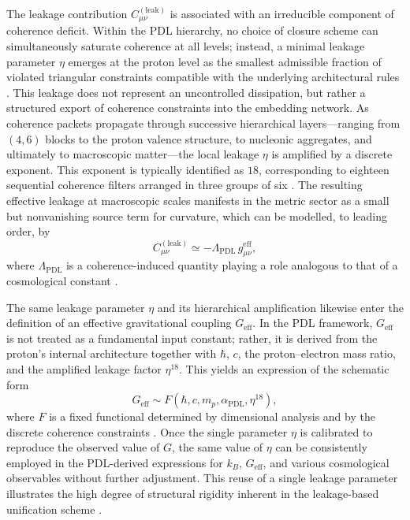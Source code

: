 \documentclass[11pt,a4paper]{article}
\theoremstyle{definition}
\newcommand{\PDL}{\mathrm{PDL}}
\newcommand{\Geff}{G_{\mathrm{eff}}}
\newcommand{\alphaPDL}{\alpha_{\mathrm{PDL}}}
\newcommand{\etaL}{\eta} %
\begin{document}
The leakage contribution $C_{\mu\nu}^{(\mathrm{leak})}$ is associated with an irreducible component of coherence deficit. Within the PDL hierarchy, no choice of closure scheme can simultaneously saturate coherence at all levels; instead, a minimal leakage parameter $\etaL$ emerges at the proton level as the smallest admissible fraction of violated triangular constraints compatible with the underlying architectural rules \cite{A_Topological_Reformulation_in_the_Projective_Dynamic_Logo_Framework_Hierarchical_Coherence_Filtering_and_the_Exponent_18_in_PDL,PDL_Global_Mapping_Structures_Results_Open_Problems}. This leakage does not represent an uncontrolled dissipation, but rather a structured export of coherence constraints into the embedding network. As coherence packets propagate through successive hierarchical layers—ranging from $(4,6)$ blocks to the proton valence structure, to nucleonic aggregates, and ultimately to macroscopic matter—the local leakage $\etaL$ is amplified by a discrete exponent. This exponent is typically identified as $18$, corresponding to eighteen sequential coherence filters arranged in three groups of six \cite{Hierarchical_Coherence_Filtering_and_the_Exponent_18_in_PDL}. The resulting effective leakage at macroscopic scales manifests in the metric sector as a small but nonvanishing source term for curvature, which can be modelled, to leading order, by
\[
C_{\mu\nu}^{(\mathrm{leak})} \simeq -\Lambda_{\PDL}\,g_{\mu\nu}^{\mathrm{eff}},
\]
where $\Lambda_{\PDL}$ is a coherence-induced quantity playing a role analogous to that of a cosmological constant \cite{A_Topological_Reformulation_in_the_Projective_Dynamic_Logo_Framework_Hierarchical_Coherence_Filtering_and_the_Exponent_18_in_PDL,PDL_Global_Mapping_Structures_Results_Open_Problems}.

The same leakage parameter $\etaL$ and its hierarchical amplification likewise enter the definition of an effective gravitational coupling $\Geff$. In the PDL framework, $\Geff$ is not treated as a fundamental input constant; rather, it is derived from the proton’s internal architecture together with $\hbar$, $c$, the proton–electron mass ratio, and the amplified leakage factor $\etaL^{18}$. This yields an expression of the schematic form
\[
\Geff \sim F(\hbar,c,m_p,\alphaPDL,\etaL^{18}),
\]
where $F$ is a fixed functional determined by dimensional analysis and by the discrete coherence constraints \cite{PDL,PDL_Global_Mapping_Structures_Results_Open_Problems,Hierarchical_Coherence_Filtering_and_the_Exponent_18_in_PDL}. Once the single parameter $\etaL$ is calibrated to reproduce the observed value of $G$, the same value of $\etaL$ can be consistently employed in the PDL-derived expressions for $k_B$, $\Geff$, and various cosmological observables without further adjustment. This reuse of a single leakage parameter illustrates the high degree of structural rigidity inherent in the leakage-based unification scheme \cite{PDL,A_Topological_Reformulation_in_the_Projective_Dynamic_Logo_Framework_Hierarchical_Coherence_Filtering_and_the_Exponent_18_in_PDL,Hierarchical_Coherence_Filtering_and_the_Exponent_18_in_PDL}.
\end{document}
